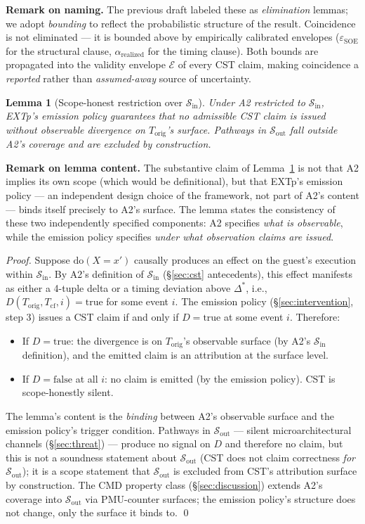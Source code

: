 \documentclass[conference]{IEEEtran}
\newtheorem{lemma}{Lemma}
\newcommand{\Korig}{T_\text{orig}}
\newcommand{\Tcf}{T_\text{cf}}
\newcommand{\Dstar}{\Delta^{*}}
\newcommand{\arealized}{\alpha_\text{realized}}
\newcommand{\dox}[1]{\text{do}(X{=}#1)}
\newcommand{\epsSOE}{\varepsilon_\text{SOE}}
\begin{document}
\textbf{Remark on naming.} The previous draft labeled these as
\emph{elimination} lemmas; we adopt \emph{bounding} to reflect the
probabilistic structure of the result. Coincidence is not
eliminated --- it is bounded above by empirically calibrated
envelopes ($\epsSOE$ for the structural clause, $\arealized$ for
the timing clause). Both bounds are propagated into the validity
envelope $\mathcal{E}$ of every CST claim, making coincidence a
\emph{reported} rather than \emph{assumed-away} source of
uncertainty.

\begin{lemma}[Scope-honest restriction over $\mathcal{S}_\text{in}$]
\label{lem:silent}
Under A2 restricted to $\mathcal{S}_\text{in}$, EXTp's emission
policy guarantees that no admissible CST claim is issued without
observable divergence on $\Korig$'s surface. Pathways in
$\mathcal{S}_\text{out}$ fall outside A2's coverage and are
excluded by construction.
\end{lemma}

\textbf{Remark on lemma content.} The substantive claim of
Lemma~\ref{lem:silent} is not that A2 implies its own scope (which
would be definitional), but that EXTp's emission policy --- an
independent design choice of the framework, not part of A2's
content --- binds itself precisely to A2's surface. The lemma
states the consistency of these two independently specified
components: A2 specifies \emph{what is observable}, while the
emission policy specifies \emph{under what observation claims are
issued}.

\textit{Proof.} Suppose $\dox{x'}$ causally produces an effect on
the guest's execution within $\mathcal{S}_\text{in}$. By A2's
definition of $\mathcal{S}_\text{in}$ (\S\ref{sec:cst}
antecedents), this effect manifests as either a 4-tuple delta or
a timing deviation above $\Dstar$, i.e., $D(\Korig, \Tcf, i) =
\text{true}$ for some event $i$. The emission policy
(\S\ref{sec:intervention}, step 3) issues a CST claim if and only
if $D = \text{true}$ at some event $i$. Therefore:
\begin{itemize}[leftmargin=*]
  \item If $D = \text{true}$: the divergence is on $\Korig$'s
    observable surface (by A2's $\mathcal{S}_\text{in}$
    definition), and the emitted claim is an attribution at the
    surface level.
  \item If $D = \text{false}$ at all $i$: no claim is emitted (by
    the emission policy). CST is scope-honestly silent.
\end{itemize}
The lemma's content is the \emph{binding} between A2's observable
surface and the emission policy's trigger condition. Pathways in
$\mathcal{S}_\text{out}$ --- silent microarchitectural channels
(\S\ref{sec:threat}) --- produce no signal on $D$ and therefore
no claim, but this is not a soundness statement about
$\mathcal{S}_\text{out}$ (CST does not claim correctness
\emph{for} $\mathcal{S}_\text{out}$); it is a scope statement that
$\mathcal{S}_\text{out}$ is excluded from CST's attribution
surface by construction. The CMD property class
(\S\ref{sec:discussion}) extends A2's coverage into
$\mathcal{S}_\text{out}$ via PMU-counter surfaces; the emission
policy's structure does not change, only the surface it binds to.
\qed
\end{document}
